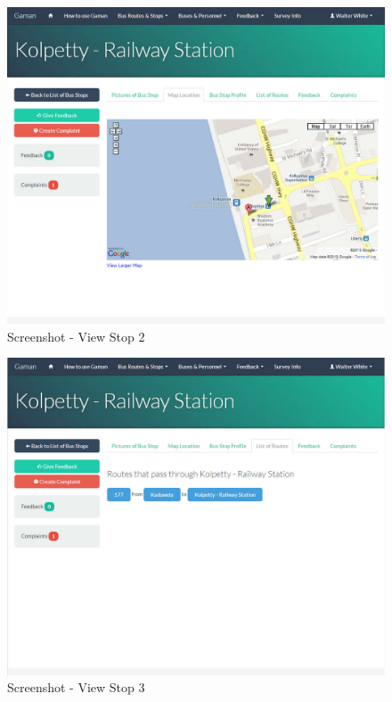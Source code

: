\documentclass[12pt, oneside]{report}
\begin{document}
\begin {figure} [h!]
\centering
\includegraphics[scale=0.2]{viewStop2}
\caption [Screenshot - View Stop 2] {Screenshot - View Stop 2}
\label {image-viewStop2}
\end {figure}

\begin {figure} [h!]
\centering
\includegraphics[scale=0.2]{viewStop3}
\caption [Screenshot - View Stop 3] {Screenshot - View Stop 3}
\label {image-viewStop3}
\end {figure}
\end{document}
